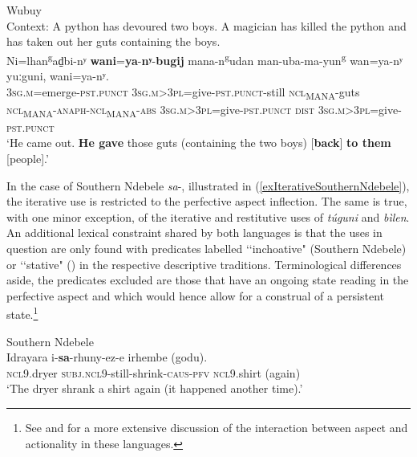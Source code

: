 \begin{exe}	
\ex	Wubuy\\
	Context: A python has devoured two boys. A magician has killed the python and has taken out her guts containing the boys.\label{exIterativeWubuy}\\
\gll 
Ni=lhan\textsuperscript{g}ad̠bi-nʸ \textbf{wani}=\textbf{ya}-\textbf{nʸ}-\textbf{bugij} mana-n\textsuperscript{g}udan man-uba-ma-yun\textsuperscript{g} wan=ya-nʸ yuːguni, wani=ya-nʸ.\\
3\textsc{sg}.\textsc{m}=emerge-\textsc{pst}.\textsc{punct} 3\textsc{sg}.\textsc{m}>3\textsc{pl}=give-\textsc{pst}.\textsc{punct}-still \textsc{ncl}\textsubscript{MANA}-guts \textsc{ncl}\textsubscript{MANA}-\textsc{anaph}-\textsc{ncl}\textsubscript{MANA}-\textsc{abs} 3\textsc{sg}.\textsc{m}>3\textsc{pl}=give-\textsc{pst}.\textsc{punct} \textsc{dist}  3\textsc{sg}.\textsc{m}>3\textsc{pl}=give-\textsc{pst}.\textsc{punct}\\
\glt \lq He came out. \textbf{He gave} those guts (containing the two boys) [\textbf{back}] \textbf{to them} [people].' \parencite[23]{Heath1980}
\end{exe}

In the case of Southern Ndebele \mbox{\textit{sa}-}, illustrated in (\ref{exIterativeSouthernNdebele}), the iterative use is restricted to the perfective aspect inflection. The same is true, with one minor exception, of the iterative and restitutive uses of  \textit{túguni} and \textit{bìlen}. An additional lexical constraint shared by both languages is that the uses in question are only found with predicates labelled \lq\lq inchoative" (Southern Ndebele) or \lq\lq stative" () in the respective descriptive traditions. Terminological differences aside, the predicates excluded are those that have an ongoing state reading in the perfective aspect and which would hence allow for a construal of a persistent state.\footnote{See \textcite{HewsonBambara} and \textcite{CranePersohn2021} for a more extensive discussion of the interaction between aspect and actionality in these languages.}

\begin{exe}
\ex Southern Ndebele\label{exIterativeSouthernNdebele}\\
\gll Idrayara i-\textbf{sa}-rhuny-ez-e irhembe (godu).\\
	\textsc{ncl}9.dryer \textsc{subj}.\textsc{ncl}9-still-shrink-\textsc{caus}-\textsc{pfv} \textsc{ncl}9.shirt (again)\\
	\glt \lq The dryer shrank a shirt again (it happened another time).'
	\\\parencite[244]{CranePersohn2021}
\end{exe}

